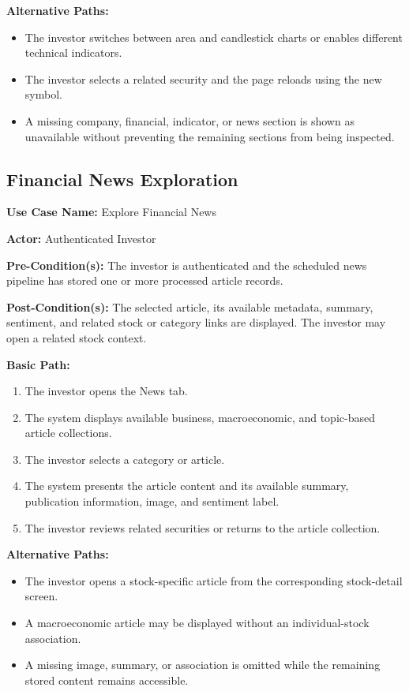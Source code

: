 \noindent\textbf{Alternative Paths:}
\begin{itemize}[leftmargin=*, nosep]
    \item The investor switches between area and candlestick charts or enables different technical indicators.
    \item The investor selects a related security and the page reloads using the new symbol.
    \item A missing company, financial, indicator, or news section is shown as unavailable without preventing the remaining sections from being inspected.
\end{itemize}

\subsection{Financial News Exploration}
\label{subsec:financial-news-exploration}

\noindent\textbf{Use Case Name:} Explore Financial News

\noindent\textbf{Actor:} Authenticated Investor

\noindent\textbf{Pre-Condition(s):} The investor is authenticated and the scheduled news pipeline has stored one or more processed article records.

\noindent\textbf{Post-Condition(s):} The selected article, its available metadata, summary, sentiment, and related stock or category links are displayed. The investor may open a related stock context.

\noindent\textbf{Basic Path:}
\begin{enumerate}[leftmargin=*, nosep]
    \item The investor opens the News tab.
    \item The system displays available business, macroeconomic, and topic-based article collections.
    \item The investor selects a category or article.
    \item The system presents the article content and its available summary, publication information, image, and sentiment label.
    \item The investor reviews related securities or returns to the article collection.
\end{enumerate}

\noindent\textbf{Alternative Paths:}
\begin{itemize}[leftmargin=*, nosep]
    \item The investor opens a stock-specific article from the corresponding stock-detail screen.
    \item A macroeconomic article may be displayed without an individual-stock association.
    \item A missing image, summary, or association is omitted while the remaining stored content remains accessible.
\end{itemize}

